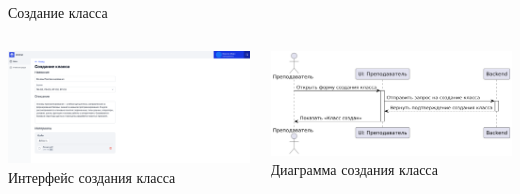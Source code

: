 \documentclass[aspectratio=169]{beamer}
\begin{document}
\begin{frame}{Создание класса}
\vspace{0.5em}

\begin{columns}
    \begin{column}{0.5\textwidth}
        \centering
        \includegraphics[width=0.95\linewidth]{static/ClassRoomCreate.png} \\
        \small Интерфейс создания класса
    \end{column}
    \begin{column}{0.5\textwidth}
        \centering
        \includegraphics[width=0.95\linewidth]{static/ClassRoomCreateDiagram.png} \\
        \small Диаграмма создания класса
    \end{column}
\end{columns}
\end{frame}
\end{document}
